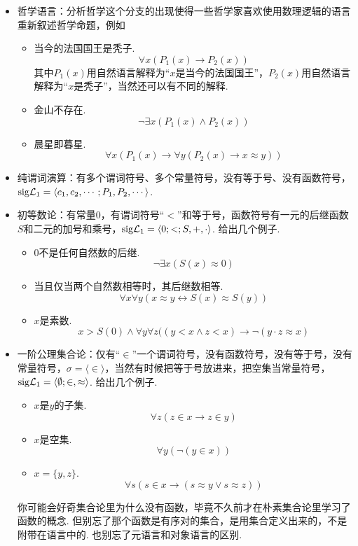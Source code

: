 \documentclass[main.tex]{subfiles}
\begin{document}
\begin{itemize}
    \item 哲学语言：分析哲学这个分支的出现使得一些哲学家喜欢使用数理逻辑的语言重新叙述哲学命题，例如
    \begin{itemize}
        \item 当今的法国国王是秃子.
        \[\forall x (P_1(x) \to P_2(x))\]
        其中\(P_1(x)\)用自然语言解释为“\(x\)是当今的法国国王”，\(P_2(x)\)用自然语言解释为“\(x\)是秃子”，当然还可以有不同的解释.
        \item 金山不存在.
        \[\neg \exists x(P_1(x) \wedge P_2(x))\]
        \item 晨星即暮星.
        \[\forall x(P_1(x) \to \forall y (P_2(x) \to x \approx y))\]
    \end{itemize}
    \item 纯谓词演算：有多个谓词符号、多个常量符号，没有等于号、没有函数符号，\({\rm sig}\mathcal{L}_1 = \langle c_1, c_2, \cdots; P_1, P_2, \cdots \rangle\).
    \item 初等数论：有常量\(0\)，有谓词符号“\(<\)”和等于号，函数符号有一元的后继函数\(S\)和二元的加号和乘号，\({\rm sig}\mathcal{L}_1 = \langle 0; <; S, +, \cdot \rangle\). 给出几个例子.
    \begin{itemize}
        \item \(0\)不是任何自然数的后继.
        \[\neg \exists x (S(x) \approx 0)\]
        \item 当且仅当两个自然数相等时，其后继数相等.
        \[\forall x \forall y(x \approx y \leftrightarrow S(x) \approx S(y))\]
        \item \(x\)是素数.
        \[x > S(0) \wedge \forall y \forall z ((y < x \wedge z < x) \to \neg(y \cdot z \approx x) \]
    \end{itemize}
    \item 一阶公理集合论：仅有“\(\in\)”一个谓词符号，没有函数符号，没有等于号，没有常量符号，\(\sigma = \langle \in \rangle\)，当然有时候把等于号放进来，把空集当常量符号，\({\rm sig}\mathcal{L}_1 = \langle \emptyset; \in, \approx \rangle\). 给出几个例子.
    \begin{itemize}
        \item \(x\)是\(y\)的子集.
        \[\forall z (z \in x \to z \in y)\]
        \item \(x\)是空集.
        \[\forall y (\neg (y \in x))\]
        \item \(x=\{y,z\}\).
        \[\forall s(s \in x \to (s \approx y \vee s \approx z))\]
    \end{itemize}
    你可能会好奇集合论里为什么没有函数，毕竟不久前才在朴素集合论里学习了函数的概念. 但别忘了那个函数是有序对的集合，是用集合定义出来的，不是附带在语言中的. 也别忘了元语言和对象语言的区别. 
\end{itemize}
\end{document}
